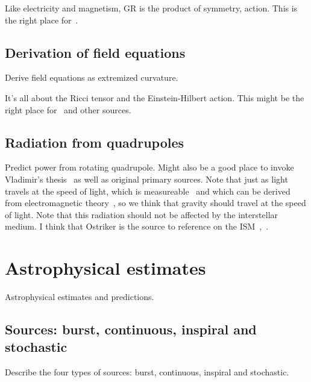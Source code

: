             Like electricity and magnetism, GR is the product of symmetry, action. This is the right place for~\cite{Carroll1997}.

        \subsection{Derivation of field equations}
        \label{field_equations}

            Derive field equations as extremized curvature.

		It's all about the Ricci tensor and the Einstein-Hilbert action. This might be the right place for~\cite{FarrThesis} and other sources.

        \subsection{Radiation from quadrupoles}
        \label{radiation}
  
            Predict power from rotating quadrupole. Might also be a good place to invoke Vladimir's thesis~\cite{DergachevThesis} as well as original primary sources. Note that just as light travels at the speed of light, which is measureable~\cite{CODATA} and which can be derived from electromagnetic theory~\cite{GriffithsE}, so we think that gravity should travel at the speed of light. Note that this radiation should not be affected by the interstellar medium. I think that Ostriker is the source to reference on the ISM~\cite{Caldwell1981},~\cite{McKee1977}.

    \section{Astrophysical estimates}
    \label{estimates}

        Astrophysical estimates and predictions.

        \subsection{Sources: burst, continuous, inspiral and stochastic}
        \label{source_types}

            Describe the four types of sources: burst, continuous, inspiral and stochastic.

